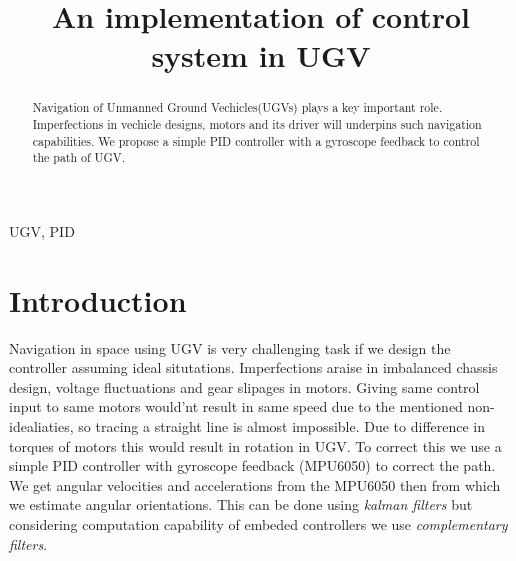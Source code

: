\documentclass[conference]{IEEEtran}
\begin{document}
\title{An implementation of control system in UGV}
\author{
\and
{}
\and
{}
\and
{}
}

\maketitle

\begin{abstract}
Navigation of Unmanned Ground Vechicles(UGVs) plays a key important role. Imperfections in vechicle designs, motors and its driver will underpins such navigation capabilities. We propose a simple PID controller with a gyroscope feedback to control the path of UGV. 
\end{abstract}

\begin{IEEEkeywords}
UGV, PID
\end{IEEEkeywords}

\section{Introduction}
Navigation in space using UGV is very challenging task if we design the controller assuming ideal situtations. Imperfections araise in imbalanced chassis design, voltage fluctuations and gear slipages in motors. Giving same control input to same motors would'nt result in same speed due to the mentioned non-idealiaties, so tracing a straight line is almost impossible. Due to difference in torques of motors this would result in rotation in UGV. To correct this we use a simple PID controller with gyroscope feedback (MPU6050) to correct the path. We get angular velocities and accelerations from the MPU6050 then from which we estimate angular orientations. This can be done using \textit{kalman filters} but considering computation capability of embeded controllers we use \textit{complementary filters}.
\end{document}
